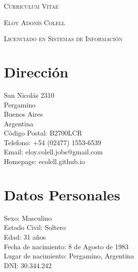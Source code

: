 \documentclass[a4paper]{article}
\begin{document}
\pagestyle{plain}

\begin{center}
\huge{\textsc{Curriculum Vitae}}
\vspace{\baselineskip}

\Large{\textsc{Eloy Adonis Colell}}
\vspace{\baselineskip}

\small{\textsc{Licenciado en Sistemas de Información}}
\end{center}
\vspace{1.5\baselineskip}

\section{Dirección}
\begin{flushleft}
San Nicolás 2310 \\
Pergamino \\
Buenos Aires \\
Argentina \\
Código Postal: B2700LCR \\
Telefono: +54 (02477) 1553-6539 \\
Email: eloy.colell.jobs@gmail.com \\
Homepage: ecolell.github.io\\
\end{flushleft}

\section{Datos Personales}
\begin{flushleft}  
Sexo: Masculino \\
Estado Civil: Soltero \\
Edad: 31 años \\
Fecha de nacimiento: 8 de Agosto de 1983 \\
Lugar de nacimiento: Pergamino, Argentina \\
DNI: 30.344.242 \\
\end{flushleft}
\end{document}
